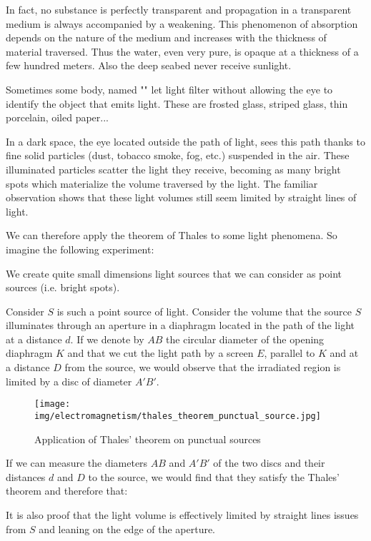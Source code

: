 	In fact, no substance is perfectly transparent and propagation in a transparent medium is always accompanied by a weakening. This phenomenon of absorption depends on the nature of the medium and increases with the thickness of material traversed. Thus the water, even very pure, is opaque at a thickness of a few hundred meters. Also the deep seabed never receive sunlight.
	
	Sometimes some body, named "" let light filter  without allowing the eye to identify the object that emits light. These are frosted glass, striped glass, thin porcelain, oiled paper...
	
	In a dark space, the eye located outside the path of light, sees this path thanks to fine solid particles (dust, tobacco smoke, fog, etc.) suspended in the air. These illuminated particles scatter the light they receive, becoming as many bright spots which materialize the volume traversed by the light. The familiar observation shows that these light volumes still seem limited by straight lines of light.
	
	We can therefore apply the theorem of Thales to some light phenomena. So imagine the following experiment:
	
	We create quite small dimensions light sources that we can consider as point sources (i.e. bright spots).
	
	Consider $S$ is such a point source of light. Consider the volume that the source $S$ illuminates through an aperture in a diaphragm located in the path of the light at a distance $d$. If we denote by $AB$ the circular diameter of the opening diaphragm $K$ and that we cut the light path by a screen $E$, parallel to $K$ and at a distance $D$ from the source, we would observe that the irradiated region is limited by a disc of diameter $A'B'$.
	
	\begin{figure}[H]
		\centering
		\texttt{[image: img/electromagnetism/thales\_theorem\_punctual\_source.jpg]}
		\caption{Application of Thales' theorem on punctual sources}
	\end{figure}
	If we can measure the diameters $AB$ and $A'B'$ of the two discs and their distances $d$ and $D$ to the source, we would find that they satisfy the Thales' theorem and therefore that:
	
	It is also proof that the light volume is effectively limited by straight lines issues from $S$ and leaning on the edge of the aperture.
	
